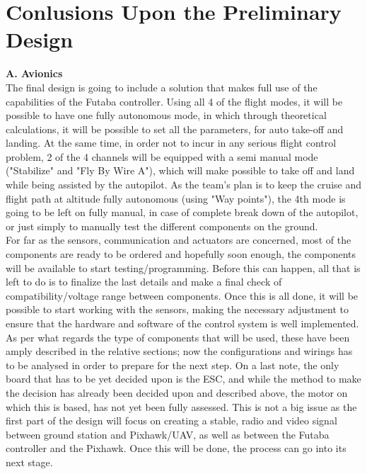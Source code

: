 \documentclass[12pt]{article}
\begin{document}
\section{Conlusions Upon the Preliminary Design}

\textbf{A. Avionics}\\
\noindent The final design is going to include a solution that makes full use of the capabilities of the Futaba controller. Using all 4 of the flight modes, it will be possible to have one fully autonomous mode, in which   through theoretical calculations, it will be possible to set all the parameters, for auto take-off and landing. At the same time, in order not to incur in any serious flight control problem, 2 of the 4 channels will be equipped with a semi manual mode ("Stabilize" and "Fly By Wire A"), which will make possible to take off and land while being assisted by the autopilot. As the team's plan is to keep the cruise and flight path at altitude fully autonomous (using "Way points"), the 4th mode is going to be left on fully manual, in case of complete break down of the autopilot, or just simply to manually test the different components on the ground.\\

\noindent For far as the sensors, communication and actuators are concerned, most of the components are ready to be ordered and hopefully soon enough, the components will be available to start testing/programming. Before this can happen, all that is left to do is to finalize the last details and make a final check of compatibility/voltage range between components. Once this is all done, it will be possible to start working with the sensors, making the necessary adjustment to ensure that the hardware and software of the control system is well implemented. As per what regards the type of components that will be used, these have been amply described in the relative sections; now the configurations and wirings has to be analysed in order to prepare for the next step. On a last note, the only board that has to be yet decided upon is the ESC, and while the method to make the decision has already been decided upon and described above, the motor on which this is based, has not yet been fully assessed. This is not a big issue as the first part of the design will focus on creating a stable, radio and video signal between ground station and Pixhawk/UAV, as well as between the Futaba controller and the Pixhawk. Once this will be done, the process can go into its next stage. \\
\end{document}
